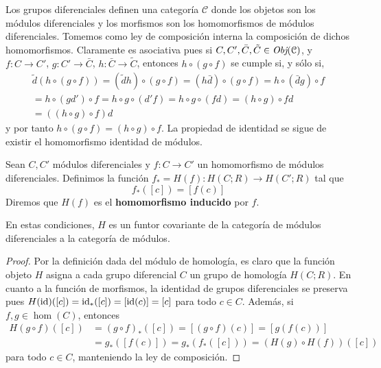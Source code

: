 Los grupos diferenciales definen una categoría $\mathcal{C}$ donde los objetos son los módulos
diferenciales y los morfismos son los homomorfismos de módulos diferenciales. Tomemos
como ley de composición interna la composición de dichos homomorfismos.
Claramente es asociativa pues si \(C, C', \bar{C}, \tilde{C}\in \operatorname{\textit{Obj}}(\mathcal{C})\), y \(f\colon
C \to C'\), \(g \colon C' \to \bar{C}\), \(h\colon \bar{C}\to \tilde{C}\), entonces
\(h \circ (g \circ f)\) se cumple si, y sólo si,
\begin{gather*}
	\tilde{d}(h \circ (g \circ f)) = (\tilde{d}h) \circ (g \circ f) = (h\bar{d}) \circ
	(g \circ f) = h \circ (\bar{d}g) \circ f \\ = h \circ (g d') \circ f = h \circ
	g \circ (d'f) = h \circ g \circ (fd) = (h \circ g) \circ fd \\ = ((h \circ g) \circ
	f) d
\end{gather*}
y por tanto \(h \circ (g \circ f) = (h \circ g) \circ f\). La propiedad de identidad
se sigue de existir el homomorfismo identidad de módulos.

\begin{definicion}
	Sean \(C, C'\) módulos diferenciales y \(f:C \rightarrow C'\) un homomorfismo de módulos
	diferenciales. Definimos la función \(f_{*}= H(f): H(C;R) \rightarrow H(C';R)\)
	tal que
	\[
	f_{*}([c]) = [f(c)]
	\]
	Diremos que \(H(f)\) es el \textbf{homomorfismo inducido} por \(f\).
\end{definicion}
\begin{proposicion}
	En estas condiciones, \(H\) es un funtor covariante de la categoría de módulos
	diferenciales a la categoría de módulos.
\end{proposicion}
\begin{proof}
	Por la definición dada del módulo de homología, es claro que la función objeto
	\(H\) asigna a cada grupo diferencial \(C\) un grupo de homología \(H(C;R)\). En cuanto
	a la función de morfismos, la identidad de grupos diferenciales se preserva
	pues \(H(\operatorname{id})([c]) = \operatorname{id}_{*}([c]) = [\operatorname{id}(c)] = [c]\) para todo \(c \in C\). Además,
	si \(f,g \in \hom(C)\), entonces
	\begin{align*}
		H(g \circ f)([c]) & = (g \circ f)_{*}([c]) = [(g \circ f)(c)] = [g (f (c))]         \\
		& = g_{*}([f(c)]) = g_{*} ( f_{*}([c])) = (H(g) \circ H(f)) ([c])
	\end{align*}
	para todo \(c \in C\), manteniendo la ley de composición.
\end{proof}

